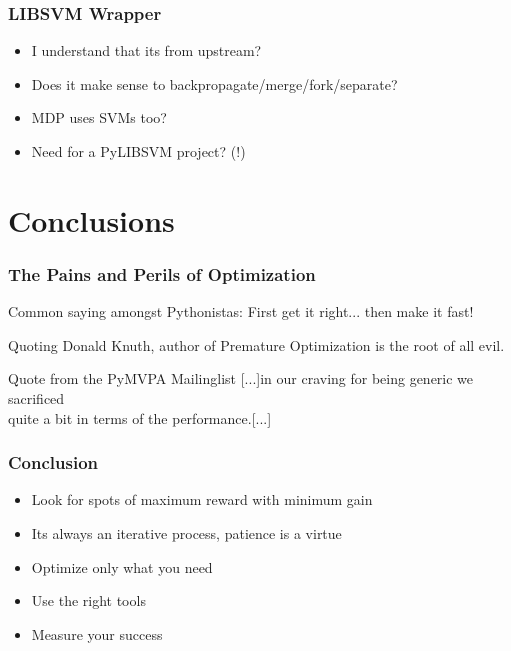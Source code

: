 \begin{frame}
 \frametitle{LIBSVM Wrapper}
  


\begin{itemize}
  \item I understand that its from upstream?
  \item Does it make sense to backpropagate/merge/fork/separate?
  \item MDP uses SVMs too?
  \item Need for a PyLIBSVM project? (!)
\end{itemize}

  
 \end{frame}

\section{Conclusions}



\begin{frame}
 \frametitle{The Pains and Perils of Optimization}
  


\begin{block}{Common saying amongst Pythonistas:}
First get it right... then make it fast!
\end{block}

\hspace{1cm}

\begin{block}{Quoting Donald Knuth, author of}
Premature Optimization is the root of all evil.
\end{block}

\hspace{1cm}

\begin{block}{Quote from the PyMVPA Mailinglist}
[...]in our craving for being generic we sacrificed \\
quite a bit in terms of the performance.[...]
\end{block}

  
 \end{frame}
\begin{frame}
 \frametitle{Conclusion}
  


\begin{itemize}
  \item Look for spots of maximum reward with minimum gain
  \item Its always an iterative process, patience is a virtue
  \item Optimize only what you need
  \item Use the right tools
  \item Measure your success
\end{itemize}


  
 \end{frame}

